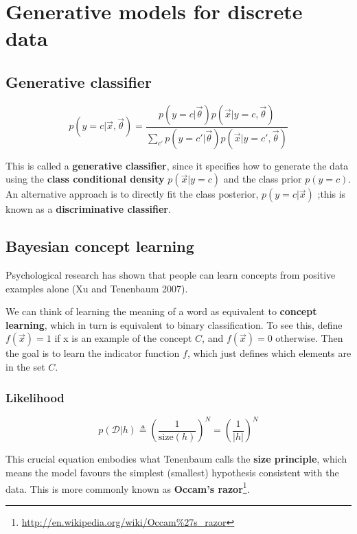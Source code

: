 \chapter{Generative models for discrete data}

\section{Generative classifier}
\begin{equation}\label{eqn:Generative-classifier}
p(y=c|\vec{x},\vec{\theta})=\dfrac{p(y=c|\vec{\theta})p(\vec{x}|y=c,\vec{\theta})}{\sum_{c'}{p(y=c'|\vec{\theta})p(\vec{x}|y=c',\vec{\theta})}}
\end{equation}

This is called a \textbf{generative classifier}, since it specifies how to generate the data using the \textbf{class conditional density} $p(\vec{x}|y=c)$ and the class prior $p(y=c)$. An alternative approach is to directly fit the class posterior, $p(y=c|\vec{x})$ ;this is known as a \textbf{discriminative classifier}. 


\section{Bayesian concept learning}
Psychological research has shown that people can learn concepts from positive examples alone (Xu and Tenenbaum 2007).

We can think of learning the meaning of a word as equivalent to \textbf{concept learning}, which in turn is equivalent to binary classification. To see this, define $f(\vec{x})=1$ if x is an example of the concept $C$, and $f(\vec{x})=0$ otherwise. Then the goal is to learn the indicator function $f$, which just defines which elements are in the set $C$.


\subsection{Likelihood}
\begin{equation}
p(\mathcal{D}|h) \triangleq \left(\dfrac{1}{\text{size}(h)}\right)^N=\left(\dfrac{1}{|h|}\right)^N
\end{equation}

This crucial equation embodies what Tenenbaum calls the \textbf{size principle}, which means the model favours the simplest (smallest) hypothesis consistent with the data. This is more commonly known as \textbf{Occam’s razor}\footnote{\url{http://en.wikipedia.org/wiki/Occam\%27s_razor}}.


